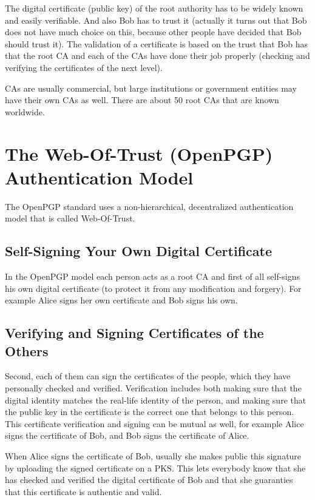 \documentclass[a4paper]{article}
\begin{document}
The digital certificate (public key) of the root authority has to be
widely known and easily verifiable. And also Bob has to trust it
(actually it turns out that Bob does not have much choice on this,
because other people have decided that Bob should trust it). The
validation of a certificate is based on the trust that Bob has that
the root CA and each of the CAs have done their job properly (checking
and verifying the certificates of the next level).

CAs are usually commercial, but large institutions or government
entities may have their own CAs as well. There are about 50 root CAs
that are known worldwide.


\section{The Web-Of-Trust (OpenPGP) Authentication Model}

The OpenPGP standard uses a non-hierarchical, decentralized
authentication model that is called Web-Of-Trust. 

\subsection{Self-Signing Your Own Digital Certificate}

In the OpenPGP model each person acts as a root CA and first of all
self-signs his own digital certificate (to protect it from any
modification and forgery). For example Alice signs her own certificate
and Bob signs his own.

\subsection{Verifying and Signing Certificates of the Others}

Second, each of them can sign the certificates of the people, which
they have personally checked and verified. Verification includes both
making sure that the digital identity matches the real-life identity
of the person, and making sure that the public key in the certificate
is the correct one that belongs to this person. This certificate
verification and signing can be mutual as well, for example Alice
signs the certificate of Bob, and Bob signs the certificate of Alice.

When Alice signs the certificate of Bob, usually she makes public this
signature by uploading the signed certificate on a PKS. This lets
everybody know that she has checked and verified the digital
certificate of Bob and that she guaranties that this certificate is
authentic and valid.
\end{document}
